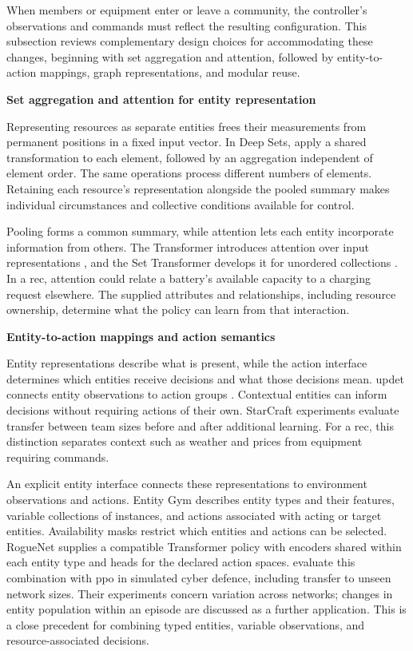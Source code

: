 When members or equipment enter or leave a community, the controller's observations and commands must reflect the resulting configuration. This subsection reviews complementary design choices for accommodating these changes, beginning with set aggregation and attention, followed by entity-to-action mappings, graph representations, and modular reuse.

\smallskip
\noindent\textbf{Set aggregation and attention for entity representation}\par\nobreak\smallskip
Representing resources as separate entities frees their measurements from permanent positions in a fixed input vector. In Deep Sets, \textcite{zaheer2017deepsets} apply a shared transformation to each element, followed by an aggregation independent of element order. The same operations process different numbers of elements. Retaining each resource's representation alongside the pooled summary makes individual circumstances and collective conditions available for control.

Pooling forms a common summary, while attention lets each entity incorporate information from others. The Transformer introduces attention over input representations \parencite{vaswani2017attention}, and the Set Transformer develops it for unordered collections \parencite{lee2019settransformer}. In a \gls{rec}, attention could relate a battery's available capacity to a charging request elsewhere. The supplied attributes and relationships, including resource ownership, determine what the policy can learn from that interaction.

\smallskip
\noindent\textbf{Entity-to-action mappings and action semantics}\par\nobreak\smallskip
Entity representations describe what is present, while the action interface determines which entities receive decisions and what those decisions mean. \gls{updet} connects entity observations to action groups \parencite{hu2021updet}. Contextual entities can inform decisions without requiring actions of their own. StarCraft experiments evaluate transfer between team sizes before and after additional learning. For a \gls{rec}, this distinction separates context such as weather and prices from equipment requiring commands.

An explicit entity interface connects these representations to environment observations and actions. Entity Gym describes entity types and their features, variable collections of instances, and actions associated with acting or target entities. Availability masks restrict which entities and actions can be selected. RogueNet supplies a compatible Transformer policy with encoders shared within each entity type and heads for the declared action spaces. \textcite{symesthompson2025entity} evaluate this combination with \gls{ppo} in simulated cyber defence, including transfer to unseen network sizes. Their experiments concern variation across networks; changes in entity population within an episode are discussed as a further application. This is a close precedent for combining typed entities, variable observations, and resource-associated decisions.

